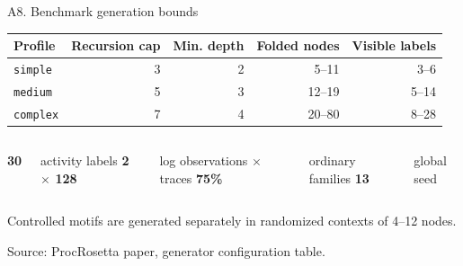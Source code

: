 \documentclass[aspectratio=169,12pt]{beamer}
\newcommand{\source}[1]{\vfill{\tiny\color{prgray}Source: #1\par}}
\begin{document}
\begin{frame}[t]{A8. Benchmark generation bounds}
  \vspace{2mm}
  \centering
  \footnotesize
  \renewcommand{\arraystretch}{1.18}
  \setlength{\tabcolsep}{5pt}
  \begin{tabular}{@{}lrrrr@{}}
    \toprule
    Profile & Recursion cap & Min. depth & Folded nodes & Visible labels \\
    \midrule
    \texttt{simple} & 3 & 2 & 5--11 & 3--6 \\
    \texttt{medium} & 5 & 3 & 12--19 & 5--14 \\
    \texttt{complex} & 7 & 4 & 20--80 & 8--28 \\
    \bottomrule
  \end{tabular}
  \vspace{3mm}
  \begin{columns}[c,onlytextwidth]
      {\fontsize{19}{22}\selectfont\bfseries\color{prblue}30}\par
      \small activity labels
      {\fontsize{19}{22}\selectfont\bfseries\color{prteal}2 $\times$ 128}\par
      \small log observations $\times$ traces
      {\fontsize{19}{22}\selectfont\bfseries\color{prgold}75\%}\par
      \small ordinary families
      {\fontsize{19}{22}\selectfont\bfseries\color{prred}13}\par
      \small global seed
  \end{columns}
  \vspace{2mm}
  \small Controlled motifs are generated separately in randomized contexts of 4--12 nodes.
  \source{ProcRosetta paper, generator configuration table.}
\end{frame}
\end{document}

